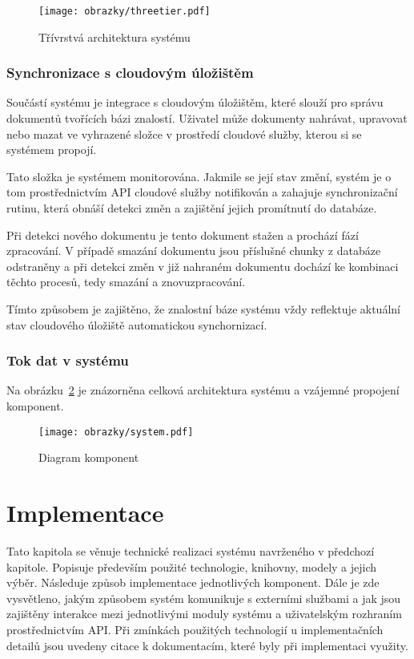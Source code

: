 \begin{figure}[H]
    \centering
    \texttt{[image: obrazky/threetier.pdf]}
    \caption{Třívrstvá architektura systému}
    \label{fig:three-tier}
\end{figure}

\subsection{Synchronizace s cloudovým úložištěm}

Součástí systému je integrace s cloudovým úložištěm, které slouží pro správu dokumentů tvořících bázi znalostí. Uživatel může dokumenty nahrávat, upravovat nebo mazat ve vyhrazené složce v prostředí cloudové služby, kterou si se systémem propojí. 

Tato složka je systémem monitorována. Jakmile se její stav změní, systém je o tom prostřednictvím API cloudové služby notifikován a zahajuje synchronizační rutinu, která obnáší detekci změn a zajištění jejich promítnutí do databáze.

Při detekci nového dokumentu je tento dokument stažen a prochází fází zpracování. V případě smazání dokumentu jsou příslušné chunky z databáze odstraněny a při detekci změn v již nahraném dokumentu dochází ke kombinaci těchto procesů, tedy smazání a znovuzpracování.

Tímto způsobem je zajištěno, že znalostní báze systému vždy reflektuje aktuální stav cloudového úložiště automatickou synchornizací.

\subsection{Tok dat v systému}

Na obrázku~\ref{fig:flow} je znázorněna celková architektura systému a vzájemné propojení komponent. 

\begin{figure}[H]
    \centering
    \texttt{[image: obrazky/system.pdf]}
    \caption{Diagram komponent}
    \label{fig:flow}
\end{figure}

\chapter{Implementace}
\label{implementace}
Tato kapitola se věnuje technické realizaci systému navrženého v předchozí kapitole. Popisuje především použité technologie, knihovny, modely a jejich výběr. Následuje způsob implementace jednotlivých komponent. Dále je zde vysvětleno, jakým způsobem systém komunikuje s externími službami a jak jsou zajištěny interakce mezi jednotlivými moduly systému a uživatelským rozhraním prostřednictvím API. Při zmínkách použitých technologií u implementačních detailů jsou uvedeny citace k dokumentacím, které byly při implementaci využity.

